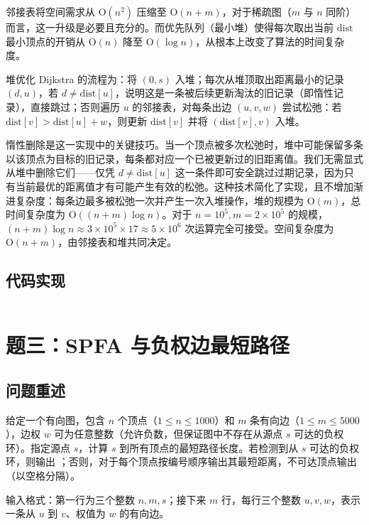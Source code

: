 \documentclass[12pt, a4paper]{academics}
\begin{document}
邻接表将空间需求从 $\mathrm{O}(n^2)$ 压缩至 $\mathrm{O}(n+m)$，对于稀疏图（$m$ 与 $n$ 同阶）而言，这一升级是必要且充分的。而优先队列（最小堆）使得每次取出当前 $\mathrm{dist}$ 最小顶点的开销从 $\mathrm{O}(n)$ 降至 $\mathrm{O}(\log n)$，从根本上改变了算法的时间复杂度。

堆优化 Dijkstra 的流程为：将 $(0, s)$ 入堆；每次从堆顶取出距离最小的记录 $(d, u)$，若 $d \neq \mathrm{dist}[u]$，说明这是一条被后续更新淘汰的旧记录（即惰性记录），直接跳过；否则遍历 $u$ 的邻接表，对每条出边 $(u, v, w)$ 尝试松弛：若 $\mathrm{dist}[v] > \mathrm{dist}[u] + w$，则更新 $\mathrm{dist}[v]$ 并将 $(\mathrm{dist}[v], v)$ 入堆。

惰性删除是这一实现中的关键技巧。当一个顶点被多次松弛时，堆中可能保留多条以该顶点为目标的旧记录，每条都对应一个已被更新过的旧距离值。我们无需显式从堆中删除它们——仅凭 $d \neq \mathrm{dist}[u]$ 这一条件即可安全跳过过期记录，因为只有当前最优的距离值才有可能产生有效的松弛。这种技术简化了实现，且不增加渐进复杂度：每条边最多被松弛一次并产生一次入堆操作，堆的规模为 $\mathrm{O}(m)$，总时间复杂度为 $\mathrm{O}((n+m) \log n)$。对于 $n = 10^5, m = 2 \times 10^5$ 的规模，$(n+m) \log n \approx 3 \times 10^5 \times 17 \approx 5 \times 10^6$ 次运算完全可接受。空间复杂度为 $\mathrm{O}(n+m)$，由邻接表和堆共同决定。

\subsection{代码实现}

\inputminted{c++}{../src/p2_dijkstra_heap.cpp}

\section{题三：SPFA 与负权边最短路径}

\subsection{问题重述}

给定一个有向图，包含 $n$ 个顶点（$1 \le n \le 1000$）和 $m$ 条有向边（$1 \le m \le 5000$），边权 $w$ 可为任意整数（允许负数，但保证图中不存在从源点 $s$ 可达的负权环）。指定源点 $s$，计算 $s$ 到所有顶点的最短路径长度。若检测到从 $s$ 可达的负权环，则输出 ；否则，对于每个顶点按编号顺序输出其最短距离，不可达顶点输出 （以空格分隔）。

输入格式：第一行为三个整数 $n, m, s$；接下来 $m$ 行，每行三个整数 $u, v, w$，表示一条从 $u$ 到 $v$、权值为 $w$ 的有向边。
\end{document}
